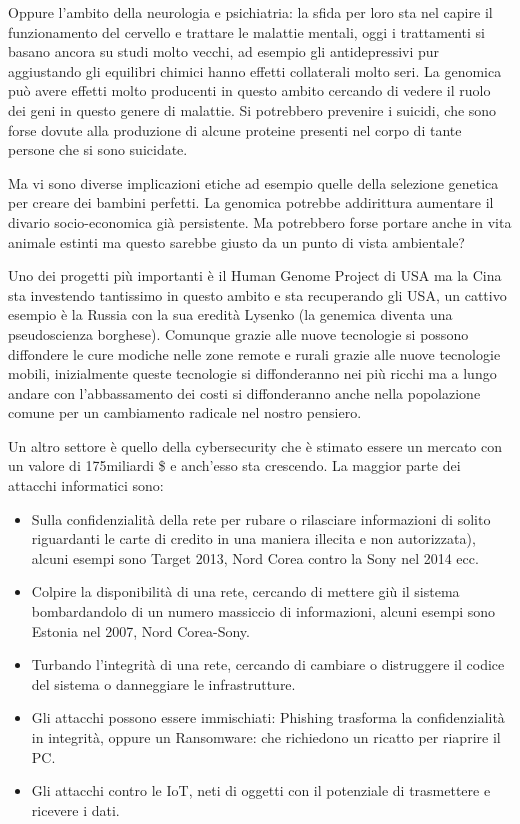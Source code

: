 \documentclass[a4page, 11pt]{article}
\begin{document}
Oppure l'ambito della neurologia e psichiatria: la sfida per loro sta
nel capire il funzionamento del cervello e trattare le malattie mentali,
oggi i trattamenti si basano ancora su studi molto vecchi, ad esempio
gli antidepressivi pur aggiustando gli equilibri chimici hanno effetti
collaterali molto seri. La genomica può avere effetti molto producenti
in questo ambito cercando di vedere il ruolo dei geni in questo genere
di malattie. Si potrebbero prevenire i suicidi, che sono forse dovute
alla produzione di alcune proteine presenti nel corpo di tante persone
che si sono suicidate.

Ma vi sono diverse implicazioni etiche ad esempio quelle della selezione
genetica per creare dei bambini perfetti. La genomica potrebbe
addirittura aumentare il divario socio-economica già persistente. Ma
potrebbero forse portare anche in vita animale estinti ma questo sarebbe
giusto da un punto di vista ambientale?

Uno dei progetti più importanti è il Human Genome Project di USA ma la
Cina sta investendo tantissimo in questo ambito e sta recuperando gli
USA, un cattivo esempio è la Russia con la sua eredità Lysenko (la
genemica diventa una pseudoscienza borghese). Comunque grazie alle nuove
tecnologie si possono diffondere le cure modiche nelle zone remote e
rurali grazie alle nuove tecnologie mobili, inizialmente queste
tecnologie si diffonderanno nei più ricchi ma a lungo andare con
l'abbassamento dei costi si diffonderanno anche nella popolazione comune
per un cambiamento radicale nel nostro pensiero.

Un altro settore è quello della cybersecurity che è stimato essere un
mercato con un valore di 175miliardi \$ e anch'esso sta crescendo. La
maggior parte dei attacchi informatici sono:

\begin{itemize}
	 
	\item
	Sulla confidenzialità della rete per rubare o rilasciare informazioni
	di solito riguardanti le carte di credito in una maniera illecita e
	non autorizzata), alcuni esempi sono Target 2013, Nord Corea contro la
	Sony nel 2014 ecc.
	\item
	Colpire la disponibilità di una rete, cercando di mettere giù il
	sistema bombardandolo di un numero massiccio di informazioni, alcuni
	esempi sono Estonia nel 2007, Nord Corea-Sony.
	\item
	Turbando l'integrità di una rete, cercando di cambiare o distruggere
	il codice del sistema o danneggiare le infrastrutture.
	\item
	Gli attacchi possono essere immischiati: Phishing trasforma la
	confidenzialità in integrità, oppure un Ransomware: che richiedono un
	ricatto per riaprire il PC.
	\item
	Gli attacchi contro le IoT, neti di oggetti con il potenziale di
	trasmettere e ricevere i dati.
\end{itemize}
\end{document}
